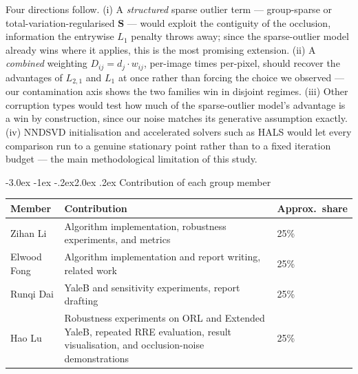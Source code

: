 \documentclass[12pt,a4paper]{article}
\makeatletter
\renewcommand\section{\@startsection{section}{1}{\z@}%
    {-3.0ex \@plus -1ex \@minus -.2ex}{2.0ex \@plus.2ex}%
    {\normalfont\fontsize{13}{15}\bfseries}}
\newcommand{\bS}{\bm{S}}
\makeatother
\begin{document}
Four directions follow. (i) A \emph{structured} sparse outlier term ---
group-sparse or total-variation-regularised $\bS$ --- would exploit the
contiguity of the occlusion, information the entrywise $L_1$ penalty throws
away; since the sparse-outlier model already wins where it applies, this is the
most promising extension. (ii) A \emph{combined} weighting
$D_{ij} = d_j \cdot w_{ij}$, per-image times per-pixel, should recover the
advantages of $L_{2,1}$ and $L_1$ at once rather than forcing the choice we
observed --- our contamination axis shows the two families win in disjoint
regimes. (iii) Other corruption types would test how much of the sparse-outlier
model's advantage is a win by construction, since our noise matches its
generative assumption exactly. (iv) NNDSVD initialisation
\citep{boutsidis2008svd} and accelerated solvers such as HALS would let every
comparison run to a genuine stationary point rather than to a fixed iteration
budget --- the main methodological limitation of this study.




\appendix
\tiny
\setlength{\parskip}{0pt}
\section{Contribution of each group member}
\begin{table}[H]
  \centering
  \small
  \begin{tabular}{lll}
    \toprule
    Member & Contribution & Approx.\ share \\
    \midrule
    Zihan Li & Algorithm implementation, robustness experiments, and metrics & 25\% \\
    Elwood Fong & Algorithm implementation and report writing, related work & 25\% \\
    Runqi Dai & YaleB and sensitivity experiments, report drafting & 25\% \\
    Hao Lu & Robustness experiments on ORL and Extended YaleB, repeated RRE evaluation, result visualisation, and occlusion-noise demonstrations & 25\% \\
    \bottomrule
  \end{tabular}
\end{table}
\end{document}
